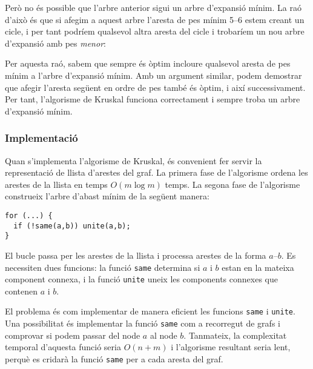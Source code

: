 Però no és possible que l'arbre anterior sigui un arbre d'expansió
mínim.  La raó d'això és que si afegim a aquest arbre l'aresta de pes
mínim 5--6 estem creant un cicle, i per tant podríem qualsevol altra
aresta del cicle i trobaríem un nou arbre d'expansió amb pes
\emph{menor}:


\begin{center}
\end{center}


Per aquesta raó, sabem que sempre és òptim incloure qualsevol aresta
de pes mínim a l'arbre d'expansió mínim. Amb un argument similar,
podem demostrar que afegir l'aresta següent en ordre de pes també és
òptim, i així successivament. Per tant, l'algorisme de Kruskal
funciona correctament i sempre troba un arbre d'expansió mínim.

\subsubsection{Implementació}

Quan s'implementa l'algorisme de Kruskal, és convenient fer servir la
representació de llista d'arestes del graf. La primera fase de
l'algorisme ordena les arestes de la llista en temps $O(m \log m)$
temps. La segona fase de l'algorisme construeix l'arbre d'abast mínim
de la següent manera:


\begin{lstlisting}
for (...) {
  if (!same(a,b)) unite(a,b);
}
\end{lstlisting}


El bucle passa per les arestes de la llista i processa arestes de la
forma $a$--$b$. Es necessiten dues funcions: la funció \texttt{same}
determina si $a$ i $b$ estan en la mateixa component connexa, i la
funció \texttt{unite} uneix les components connexes que contenen $a$ i
$b$.

El problema és com implementar de manera eficient les funcions
\texttt{same} i \texttt{unite}. Una possibilitat és implementar la
funció \texttt{same} com a recorregut de grafs i comprovar si podem
passar del node $a$ al node $b$. Tanmateix, la complexitat temporal
d'aquesta funció seria $O(n+m)$ i l'algorisme resultant seria lent,
perquè es cridarà la funció \texttt{same} per a cada aresta del
graf.

